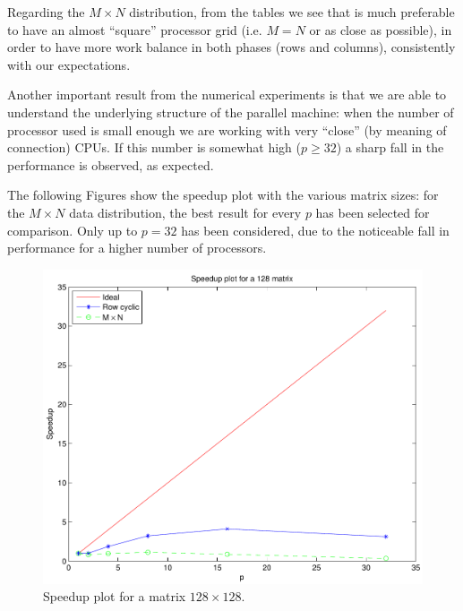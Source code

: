 \documentclass[a4paper,11pt]{article}
\begin{document}
Regarding the $M \times N$ distribution, from the tables we see that is much preferable to have an almost ``square'' processor grid (i.e. $M=N$ or as close as possible), in order to have more work balance in both phases (rows and columns), consistently with our expectations.

Another important result from the numerical experiments is that we are able to understand the underlying structure of the parallel machine: when the number of processor used is small enough we are working with very ``close'' (by meaning of connection) CPUs. If this number is somewhat high ($p\geq 32$) a sharp fall in the performance is observed, as expected.

The following Figures show the speedup plot with the various matrix sizes: for the $M \times N$ data distribution, the best result for every $p$ has been selected for comparison. Only up to $p=32$ has been considered, due to the noticeable fall in performance for a higher number of processors.

\begin{figure}[H]
\begin{center}
 \includegraphics[scale=0.6]{img/128.pdf}
\caption{Speedup plot for a matrix $128\times128$.}
\end{center}
\end{figure}
\end{document}
